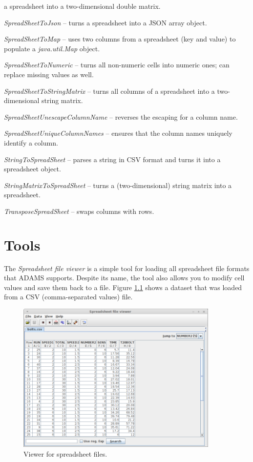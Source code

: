 \documentclass[a4paper]{book}
\begin{document}
\begin{tight_itemize}
	a spreadsheet into a two-dimensional double matrix.
	\item \textit{SpreadSheetToJson} -- turns a spreadsheet into a JSON array object.
	\item \textit{SpreadSheetToMap} -- uses two columns from a spreadsheet
	(key and value) to populate a \textit{java.util.Map} object.
	\item \textit{SpreadSheetToNumeric} -- turns all non-numeric cells into numeric
	ones; can replace missing values as well.
	\item \textit{SpreadSheetToStringMatrix} -- turns all columns of
	a spreadsheet into a two-dimensional string matrix.
	\item \textit{SpreadSheetUnescapeColumnName} -- reverses the escaping for
	a column name.
	\item \textit{SpreadSheetUniqueColumnNames} -- ensures that the column
	names uniquely identify a column.
	\item \textit{StringToSpreadSheet} -- parses a string in CSV format and
	turns it into a spreadsheet object.
	\item \textit{StringMatrixToSpreadSheet} -- turns a (two-dimensional) 
	string matrix into a spreadsheet.
	\item \textit{TransposeSpreadSheet} -- swaps columns with rows.
\end{tight_itemize}

\chapter{Tools}
The \textit{Spreadsheet file viewer} is a simple tool for loading all spreadsheet
file formats that ADAMS supports. Despite its name, the tool also allows you to
modify cell values and save them back to a file. Figure \ref{spreadsheet-viewer} shows a
dataset that was loaded from a CSV (comma-separated values) file.

\begin{figure}[htb]
  \centering
  \includegraphics[width=10.0cm]{images/spreadsheet-viewer.png}
  \caption{Viewer for spreadsheet files.}
  \label{spreadsheet-viewer}
\end{figure}
\end{document}
